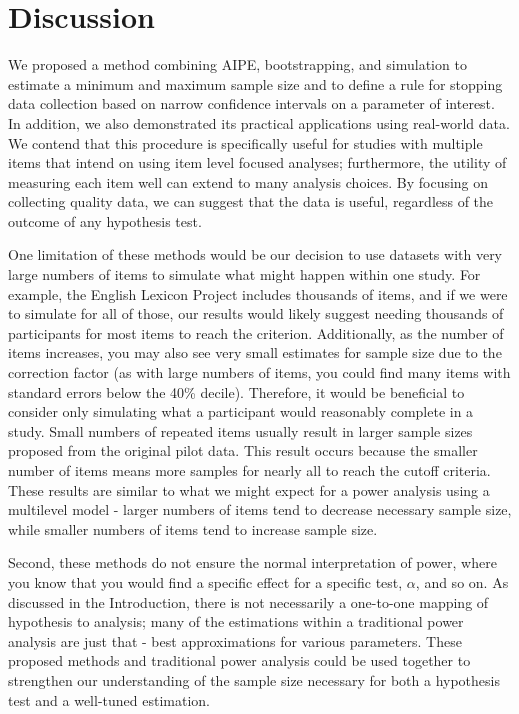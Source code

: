 \documentclass[
  man]{apa7}
\begin{document}
\hypertarget{discussion}{%
\section{Discussion}\label{discussion}}

We proposed a method combining AIPE, bootstrapping, and simulation to estimate a minimum and maximum sample size and to define a rule for stopping data collection based on narrow confidence intervals on a parameter of interest. In addition, we also demonstrated its practical applications using real-world data. We contend that this procedure is specifically useful for studies with multiple items that intend on using item level focused analyses; furthermore, the utility of measuring each item well can extend to many analysis choices. By focusing on collecting quality data, we can suggest that the data is useful, regardless of the outcome of any hypothesis test.

One limitation of these methods would be our decision to use datasets with very large numbers of items to simulate what might happen within one study. For example, the English Lexicon Project includes thousands of items, and if we were to simulate for all of those, our results would likely suggest needing thousands of participants for most items to reach the criterion. Additionally, as the number of items increases, you may also see very small estimates for sample size due to the correction factor (as with large numbers of items, you could find many items with standard errors below the 40\% decile). Therefore, it would be beneficial to consider only simulating what a participant would reasonably complete in a study. Small numbers of repeated items usually result in larger sample sizes proposed from the original pilot data. This result occurs because the smaller number of items means more samples for nearly all to reach the cutoff criteria. These results are similar to what we might expect for a power analysis using a multilevel model - larger numbers of items tend to decrease necessary sample size, while smaller numbers of items tend to increase sample size.

Second, these methods do not ensure the normal interpretation of power, where you know that you would find a specific effect for a specific test, \(\alpha\), and so on. As discussed in the Introduction, there is not necessarily a one-to-one mapping of hypothesis to analysis; many of the estimations within a traditional power analysis are just that - best approximations for various parameters. These proposed methods and traditional power analysis could be used together to strengthen our understanding of the sample size necessary for both a hypothesis test and a well-tuned estimation.
\end{document}
